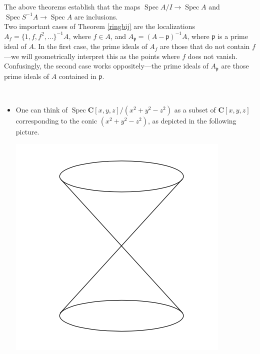 \documentclass[11pt,openany]{book} %
\newcommand{\C}{\mathbf{C}}
\newcommand{\spc}{\operatorname{Spec}}
\begin{document}
The above theorems establish that the maps $\spc A/I \to \spc A$ and $\spc S^{-1}A \to \spc A$ are inclusions. \\

Two important cases of Theorem \ref{ringbij} are the localizations $A_f = \{1,f,f^2,\ldots\}^{-1}A$, where $f \in A$, and $A_{\mathfrak{p}} = (A - \mathfrak{p})^{-1}A$, where $\mathfrak{p}$ is a prime ideal of $A$. In the first case, the prime ideals of $A_f$ are those that do not contain $f$---we will geometrically interpret this as the points where $f$ does not vanish. Confusingly, the second case works oppositely---the prime ideals of $A_{\mathfrak{p}}$ are those prime ideals of $A$ contained in $\mathfrak{p}$.\\

\begin{example}\
\begin{itemize}
	\item One can think of $\spc \C[x,y,z]/(x^2 + y^2 - z^2)$ as a subset of $\C[x,y,z]$ corresponding to the conic $(x^2 + y^2 - z^2)$, as depicted in the following picture.
    \begin{center}
    \includegraphics[scale=0.6]{quotientsubset}
    \end{center}
    

\end{itemize}
\end{example}
\end{document}
